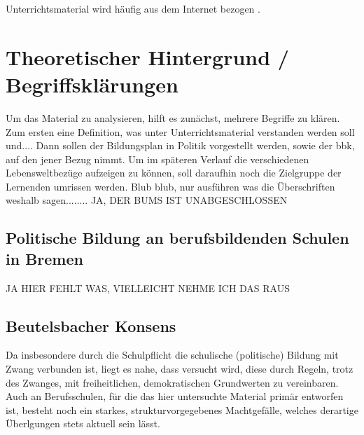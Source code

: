 Unterrichtsmaterial wird häufig aus dem Internet bezogen \autocite[82]{Neumann2015}. %


\section{Theoretischer Hintergrund / Begriffsklärungen}
Um das Material zu analysieren, hilft es zunächst, mehrere Begriffe zu klären. Zum ersten eine Definition, was unter Unterrichtsmaterial verstanden werden soll und.... %
Dann sollen der Bildungsplan in Politik vorgestellt werden, sowie der \gls{bbk}, auf den jener Bezug nimmt. Um im späteren Verlauf die verschiedenen Lebensweltbezüge aufzeigen zu können, soll daraufhin noch die Zielgruppe der Lernenden umrissen werden. 
Blub blub, nur ausführen was die Überschriften weshalb sagen........
JA, DER BUMS IST UNABGESCHLOSSEN




\subsection{Politische Bildung an berufsbildenden Schulen in Bremen}
JA HIER FEHLT WAS, VIELLEICHT NEHME ICH DAS RAUS

\subsection{Beutelsbacher Konsens \label{bbk}}%
Da insbesondere durch die Schulpflicht \autocite{BremSchulG} die schulische (politische) Bildung mit Zwang verbunden ist, liegt es nahe, dass versucht wird, diese durch Regeln, trotz des Zwanges, mit freiheitlichen, demokratischen Grundwerten zu vereinbaren. Auch an Berufsschulen, für die das hier untersuchte Material primär entworfen ist, besteht noch ein starkes, strukturvorgegebenes Machtgefälle, welches derartige Überlgungen stets aktuell sein lässt. 

